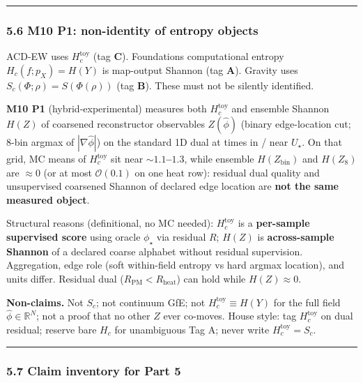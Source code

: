 \documentclass[
  11pt,
]{article}
\begin{document}
\begin{center}\rule{0.5\linewidth}{0.5pt}\end{center}

\subsubsection{5.6 M10 P1: non-identity of entropy
objects}\label{m10-p1-non-identity-of-entropy-objects}

ACD-EW uses \(H_c^{\mathrm{toy}}\) (tag \textbf{C}). Foundations
computational entropy \(H_c(f;p_X)=H(Y)\) is map-output Shannon (tag
\textbf{A}). Gravity uses \(S_c(\Phi;\rho)=S(\Phi(\rho))\) (tag
\textbf{B}). These must not be silently identified.

\textbf{M10 P1} (hybrid-experimental) measures both
\(H_c^{\mathrm{toy}}\) and ensemble Shannon \(H(Z)\) of coarsened
reconstructor observables \(Z(\hat\phi)\) (binary edge-location cut;
8-bin argmax of \(|\nabla\hat\phi|\)) on the standard 1D dual at times
in / near \(U_\star\). On that grid, MC means of \(H_c^{\mathrm{toy}}\)
sit near \textbf{\(\sim 1.1\)--\(1.3\)}, while ensemble
\(H(Z_{\mathrm{bin}})\) and \(H(Z_8)\) are \textbf{\(\approx 0\)} (or at
most \(\mathcal{O}(0.1)\) on one heat row): residual dual quality and
unsupervised coarsened Shannon of declared edge location are \textbf{not
the same measured object}.

Structural reasons (definitional, no MC needed): \(H_c^{\mathrm{toy}}\)
is a \textbf{per-sample supervised score} using oracle \(\phi_\star\)
via residual \(R\); \(H(Z)\) is \textbf{across-sample Shannon} of a
declared coarse alphabet without residual supervision. Aggregation, edge
role (soft within-field entropy vs hard argmax location), and units
differ. Residual dual (\(R_{\mathrm{PM}}<R_{\mathrm{heat}}\)) can hold
while \(H(Z)\approx 0\).

\textbf{Non-claims.} Not \(S_c\); not continuum GfE; not
\(H_c^{\mathrm{toy}}\equiv H(Y)\) for the full field
\(\hat\phi\in\mathbb{R}^N\); not a proof that no other \(Z\) ever
co-moves. House style: tag \(H_c^{\mathrm{toy}}\) on dual residual;
reserve bare \(H_c\) for unambiguous Tag A; never write
\(H_c^{\mathrm{toy}}=S_c\).

\begin{center}\rule{0.5\linewidth}{0.5pt}\end{center}

\subsubsection{5.7 Claim inventory for Part
5}\label{claim-inventory-for-part-5}
\end{document}
